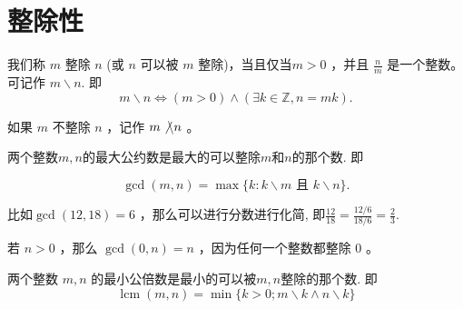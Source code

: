 \documentclass{ctexart}
\newcommand{\bzc}{\not\backslash}
\begin{document}
\section{整除性}

\begin{definition}
    我们称 $m$ 整除 $n$ (或 $n$ 可以被 $m$ 整除)，当且仅当$m>0$ ，并且 $\frac{n}{m}$ 是一个整数。可记作 $m \backslash n$. 即
$$
m \backslash n \Leftrightarrow(m>0) \wedge(\exists k \in \mathbb{Z}, n=m k) .
$$

如果 $m$ 不整除 $n$ ，记作 $m \bzc n$ 。

\end{definition}

\begin{definition}[最大公约数]
    两个整数$m, n$的最大公约数是最大的可以整除$m$和$n$的那个数. 即

    $$
\operatorname{gcd}(m, n)=\max \{k: k \backslash m \text { 且 } k \backslash n\} .
$$
\end{definition}

比如$\operatorname{gcd}(12,18)=6$ ，那么可以进行分数进行化简, 即$\frac{12}{18}=\frac{12 / 6}{18/6}=\frac{2}{3}$.

\begin{remark}
    若 $n>0$ ，那么 $\operatorname{gcd}(0, n)=n$ ，因为任何一个整数都整除 0 。
\end{remark}

\begin{definition}[最小公倍数]
    两个整数 $m,n$ 的最小公倍数是最小的可以被$m,n$整除的那个数. 即
    $$
\operatorname{lcm}(m, n)=\min \{k>0 ; m \backslash k \wedge n \backslash k\}
$$
\end{definition}
\end{document}

